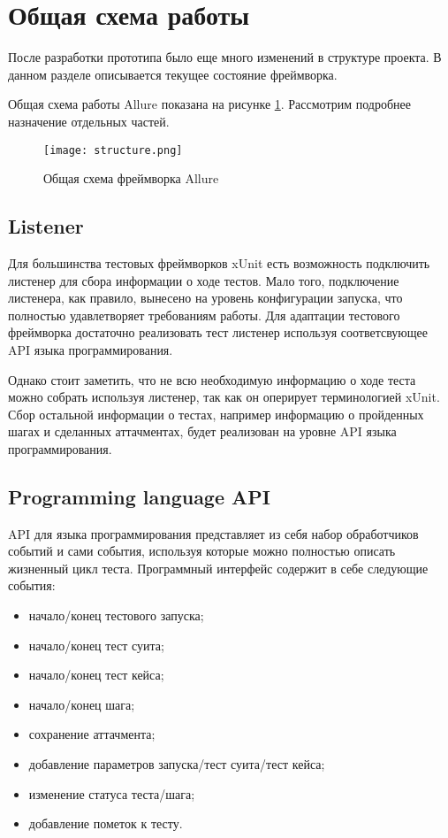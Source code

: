 \section{Общая схема работы} 

После разработки прототипа было еще много изменений в структуре проекта. В данном разделе описывается текущее состояние фреймворка.

Общая схема работы Allure показана на рисунке \ref{fig:allure}. Рассмотрим подробнее назначение отдельных частей.

\begin{figure}[htb]
\centering
\texttt{[image: structure.png]}
\caption{Общая схема фреймворка Allure}
\label{fig:allure}
\end{figure}

\subsection{Listener}

Для большинства тестовых фреймворков xUnit есть возможность подключить листенер для сбора информации о ходе тестов. Мало того, подключение листенера, как правило, вынесено на уровень конфигурации запуска, что полностью удавлетворяет требованиям работы. Для адаптации тестового фреймворка достаточно реализовать тест листенер используя соответсвующее API языка программирования.

Однако стоит заметить, что не всю необходимую информацию о ходе теста можно собрать используя листенер, так как он оперирует терминологией xUnit. Сбор остальной информации о тестах, например информацию о пройденных шагах и сделанных аттачментах, будет реализован на уровне API языка программирования.

\subsection{Programming language API}

API для языка программирования представляет из себя набор обработчиков событий и сами события, используя которые можно полностью описать жизненный цикл теста. Программный интерфейс содержит в себе следующие события:

\begin{itemize}
\item начало/конец тестового запуска;
\item начало/конец тест суита;
\item начало/конец тест кейса;
\item начало/конец шага;
\item сохранение аттачмента;
\item добавление параметров запуска/тест суита/тест кейса;
\item изменение статуса теста/шага;
\item добавление пометок к тесту.
\end{itemize}


